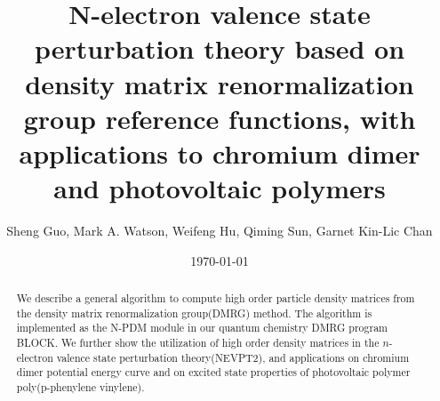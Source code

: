 \documentclass[
 aip,
 jcp,
 numerical ,
 reprint, %
]{revtex4-1}
\begin{document}
\title{N-electron valence state perturbation theory based on density matrix renormalization group reference functions, with applications to chromium dimer and photovoltaic polymers}
\author{Sheng Guo, Mark A. Watson, Weifeng Hu, Qiming Sun, Garnet Kin-Lic Chan}

\begin{abstract}
We describe a general algorithm to compute high order particle density matrices 
from the density matrix renormalization group(DMRG) method. The algorithm is implemented 
as the N-PDM module in our quantum chemistry DMRG program BLOCK\cite{sharma_spin-adapted_2012}.
We further show the utilization of high order 
density matrices in the $n$-electron valence state perturbation theory(NEVPT2), 
and applications on chromium dimer potential energy curve and on excited state properties of photovoltaic polymer poly(p-phenylene vinylene).

\end{abstract}

\date{\today}

\maketitle

















{}
\end{document}
